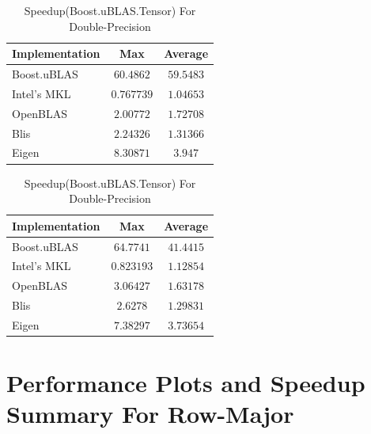 \begin{table}[ht]
    \centering
    \caption{Speedup(Boost.uBLAS.Tensor) For Single-Precision}
    \begin{tabular}{|l|c|c|}
        \hline
        \textbf{Implementation} & \textbf{Max} & \textbf{Average}\\
        \hline
        Boost.uBLAS         & $60.4862$ & $59.5483$ \\
        \hline
        Intel's MKL         & $0.767739$ & $1.04653$ \\
        \hline
        OpenBLAS            & $2.00772$ & $1.72708$ \\
        \hline
        Blis                & $2.24326$ & $1.31366$ \\
        \hline
        Eigen               & $8.30871$ & $3.947$ \\
        \hline
    \end{tabular}

    \vspace*{1 cm}

    \centering
    \caption{Speedup(Boost.uBLAS.Tensor) For Double-Precision}
    \begin{tabular}{|l|c|c|}
        \hline
        \textbf{Implementation} & \textbf{Max} & \textbf{Average}\\
        \hline
        Boost.uBLAS         & $64.7741$ & $41.4415$ \\
        \hline
        Intel's MKL         & $0.823193$ & $1.12854$ \\
        \hline
        OpenBLAS            & $3.06427$ & $1.63178$ \\
        \hline
        Blis                & $2.6278$ & $1.29831$ \\
        \hline
        Eigen               & $7.38297$ & $3.73654$ \\
        \hline
    \end{tabular}
\end{table}

\clearpage
\section{Performance Plots and Speedup Summary For Row-Major}

